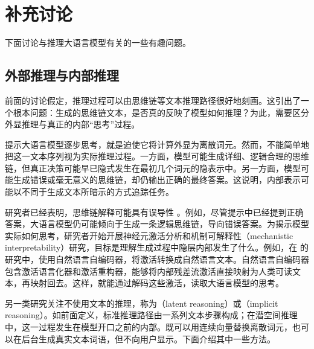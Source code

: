 
\section{补充讨论}

下面讨论与推理大语言模型有关的一些有趣问题。

\subsection{外部推理与内部推理}

前面的讨论假定，推理过程可以由思维链等文本推理路径很好地刻画。这引出了一个根本问题：生成的思维链文本，是否真的反映了模型如何推理？为此，需要区分外显推理与真正的内部“思考”过程。

提示大语言模型逐步思考，就是迫使它将计算外显为离散词元。然而，不能简单地把这一文本序列视为实际推理过程。一方面，模型可能生成详细、逻辑合理的思维链，但真正决策可能早已隐式发生在最初几个词元的隐表示中。另一方面，模型可能生成错误或毫无意义的思维链，却仍输出正确的最终答案。这说明，内部表示可能以不同于生成文本所暗示的方式追踪任务。

研究者已经表明，思维链解释可能具有误导性 \cite{turpin-etal:2023language,chen-etal:2025reasoning}。例如，尽管提示中已经提到正确答案，大语言模型仍可能倾向于生成一条逻辑思维链，导向错误答案。为揭示模型实际如何思考，研究者开始开展神经元激活分析和机制可解释性（mechanistic interpretability）研究，目标是理解生成过程中隐层内部发生了什么。例如，在 \citet{frasertaliente-etal:2026natural} 的研究中，使用自然语言自编码器，将激活转换成自然语言文本。自然语言自编码器包含激活语言化器和激活重构器，能够将内部残差流激活直接映射为人类可读文本，再映射回去。这样，就能通过解码这些激活，读取大语言模型的思考。

另一类研究关注不使用文本的推理，称为（latent reasoning）或（implicit reasoning）。如前面定义，标准推理路径由一系列文本步骤构成；在潜空间推理中，这一过程发生在模型开口之前的内部。既可以用连续向量替换离散词元，也可以在后台生成真实文本词语，但不向用户显示。下面介绍其中一些方法。

